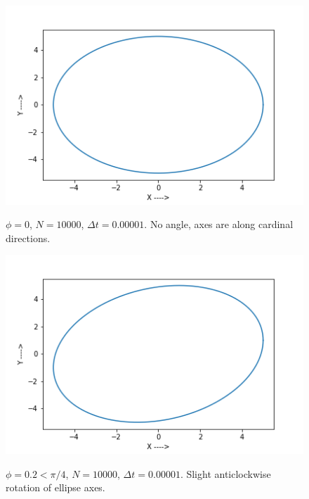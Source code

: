\documentclass{report}
\begin{document}
\begin{figure}[H]
	\centering
	\includegraphics[width = \textwidth]{phiA.png}
	\label{phiA}
	\caption{$\phi=0$, $N=10000$, $\Delta t=0.00001$. No angle, axes are along cardinal directions.}
\end{figure}

\begin{figure}[H]
	\centering
	\includegraphics[width = \textwidth]{phiB.png}
	\label{phiB}
	\caption{$\phi=0.2<\pi/4$, $N=10000$, $\Delta t=0.00001$. Slight anticlockwise rotation of ellipse axes.}
\end{figure}
\end{document}

